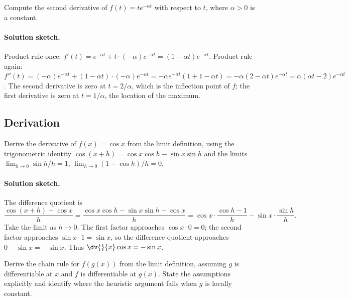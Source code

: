 \begin{exercise}
Compute the second derivative of $f(t) = t e^{-\alpha t}$ with
respect to $t$, where $\alpha > 0$ is a constant.
\end{exercise}

\paragraph{Solution sketch.}
Product rule once: $f'(t) = e^{-\alpha t} + t \cdot (-\alpha)
e^{-\alpha t} = (1 - \alpha t) e^{-\alpha t}$. Product rule
again: $f''(t) = (-\alpha) e^{-\alpha t} + (1 - \alpha t) \cdot
(-\alpha) e^{-\alpha t} = -\alpha e^{-\alpha t} (1 + 1 - \alpha t)
= -\alpha (2 - \alpha t) e^{-\alpha t} = \alpha (\alpha t - 2)
e^{-\alpha t}$. The second derivative is zero at $t = 2/\alpha$,
which is the inflection point of $f$; the first derivative is
zero at $t = 1/\alpha$, the location of the maximum.

\subsection*{Derivation}

\begin{exercise}
Derive the derivative of $f(x) = \cos x$ from the limit
definition, using the trigonometric identity $\cos(x + h) =
\cos x \cos h - \sin x \sin h$ and the limits
$\lim_{h \to 0} \sin h / h = 1$, $\lim_{h \to 0} (1 - \cos h)/h
= 0$.
\end{exercise}

\paragraph{Solution sketch.}
The difference quotient is
\[
\frac{\cos(x + h) - \cos x}{h} = \frac{\cos x \cos h - \sin x
\sin h - \cos x}{h} = \cos x \cdot \frac{\cos h - 1}{h} -
\sin x \cdot \frac{\sin h}{h}.
\]
Take the limit as $h \to 0$. The first factor approaches
$\cos x \cdot 0 = 0$; the second factor approaches $\sin x \cdot
1 = \sin x$, so the difference quotient approaches $0 - \sin x =
-\sin x$. Thus $\dv{}{x} \cos x = -\sin x$.

\begin{exercise}
Derive the chain rule for $f(g(x))$ from the limit definition,
assuming $g$ is differentiable at $x$ and $f$ is differentiable
at $g(x)$. State the assumptions explicitly and identify where
the heuristic argument fails when $g$ is locally constant.
\end{exercise}


